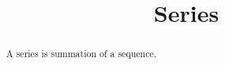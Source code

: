 \documentclass{ximera}
\title[Dig-In:]{Series}
\begin{document}
\begin{abstract}
A series is summation of a sequence.
\end{abstract}
\maketitle
\end{document}
